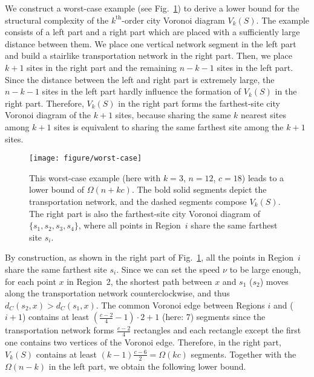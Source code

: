 \documentclass[11pt]{llncs}
\newcommand{\kth}{\ensuremath{k^{\mathrm{th}}}\xspace}
\newcommand{\kthorder}{\kth-order\xspace}
\begin{document}
We construct a worst-case example (see Fig.~\ref{fig-worst}) to derive a lower bound for the structural complexity of the \kthorder city Voronoi diagram $V_k(S)$.
The example consists of a left part and a right part which are placed with a sufficiently large distance between them.
We place one vertical network segment in the left part
and build a stairlike transportation network in the right part.
Then, we place $k+1$ sites in the right part and the remaining $n-k-1$ sites in the left part.
Since the distance between the left and right part is extremely large,
the $n-k-1$ sites in the left part hardly influence the formation of $V_k(S)$ in the right part.
Therefore, $V_k(S)$ in the right part forms the farthest-site city Voronoi diagram of the $k+1$ sites,
because sharing the same $k$ nearest sites among $k+1$ sites
is equivalent to sharing the same farthest site among the $k+1$ sites.

\begin{figure}[tb]
\center
\texttt{[image: figure/worst-case]}
\caption{This worst-case example
(here with $k = 3$, $n = 12$, $c = 18$) leads to a lower bound of $\Omega(n+kc)$.
The bold solid segments depict the transportation network,
and the dashed segments compose $V_{k}(S)$.
The right part is also the farthest-site city Voronoi diagram of $\{s_1, s_2 , s_3, s_4\}$,
where all points in Region~$i$ share the same farthest site $s_i$.
}\label{fig-worst}
\end{figure}


By construction,
as shown in the right part of Fig.~\ref{fig-worst},
all the points in Region~$i$ share the same farthest site $s_i$.
Since we can set the speed $\nu$ to be large enough,
for each point $x$ in Region~2,
the shortest path between $x$ and $s_1$ ($s_2$) moves along the transportation network counterclockwise,
and thus $d_C(s_2,x)> d_C(s_1,x)$.
The common Voronoi edge between Regions $i$ and ($i+1$)
contains at least $(\frac{c-2}{4}-1)\cdot 2+1$ (here: 7) segments
since the transportation network forms $\frac{c-2}{4}$ rectangles
and each rectangle except the first one contains two vertices of the Voronoi edge.
Therefore, in the right part,
$V_k(S)$ contains at least $(k-1)\frac{c-6}{2}=\Omega(kc)$ segments.
Together with the $\Omega(n-k)$ in the left part, we obtain the following lower bound.


\newcommand{\thmlowerdiagramtext}{The structural complexity of $V_k(S)$ is $\Omega(n+kc)$.
}
\end{document}
